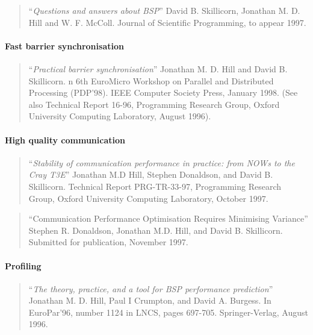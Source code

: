 \documentclass[12pt]{report}
\begin{document}
\begin{quote}
\cite{hill:qa} ``\emph{Questions and answers about BSP}'' David
     B. Skillicorn, Jonathan M. D. Hill and W. F.  McColl. Journal of
     Scientific Programming, to appear 1997.
\end{quote}

\paragraph{Fast barrier synchronisation}

\begin{quote}
\cite{hill:barrier} ``\emph{Practical barrier synchronisation}''
     Jonathan M. D. Hill and David B. Skillicorn. n 6th EuroMicro
     Workshop on Parallel and Distributed Processing (PDP'98). IEEE
     Computer Society Press, January 1998. (See also Technical Report
     16-96, Programming Research Group, Oxford University Computing
     Laboratory, August 1996).

\end{quote}

\paragraph{High quality communication}
\begin{quote}
\cite{hill:stability} ``\emph{Stability of communication performance in
     practice: from NOWs to the Cray T3E}'' Jonathan M.D Hill, Stephen
     Donaldson, and David B. Skillicorn. Technical Report
     PRG-TR-33-97, Programming Research Group, Oxford University
     Computing Laboratory, October 1997.
\end{quote}

\begin{quote}
``Communication Performance Optimisation Requires Minimising
     Variance'' Stephen R.  Donaldson, Jonathan M.D. Hill, and David
     B. Skillicorn. Submitted for publication, November 1997.
\end{quote}

\paragraph{Profiling}
\begin{quote}
\cite{hill:prof1} ``\emph{The theory, practice, and a tool for BSP
     performance prediction}'' Jonathan M. D. Hill, Paul I Crumpton,
     and David A. Burgess. In EuroPar'96, number 1124 in LNCS, pages
     697-705.  Springer-Verlag, August 1996.
\end{quote}
\end{document}
